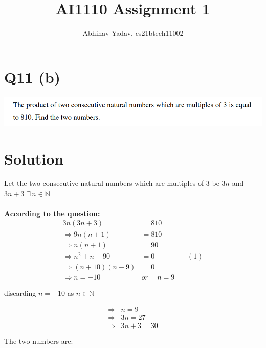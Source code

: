 \documentclass[11pt, a4paper]{article}
\title{AI1110 Assignment 1}
\author{Abhinav Yadav, cs21btech11002}
\begin{document}
    \maketitle
    \section*{Q11 (b)}
    \includegraphics[width=\textwidth]{q11_b.png}
    \section*{Solution}
    Let the two consecutive natural numbers which are multiples of $3$ be $3n$ and $3n+3$
    \hspace{5pt} $\exists \hspace{2pt} n \in \mathbb{N}$\\\\
    \textbf{According to the question:}
    \begin{align*}
        3n(3n+3) &= 810\\
        \Rightarrow 9n(n+1) &= 810\\
        \Rightarrow n(n+1) &= 90\\
        \Rightarrow n^2+n-90 &= 0\hspace{40pt} -(1)\\
        \Rightarrow (n+10)(n-9) &= 0\\
        \Rightarrow n=-10 \hspace{15pt} &or \hspace{15pt} n=9
    \end{align*}
    \begin{center}
        discarding $n=-10$ as $n \in \mathbb{N}$
    \end{center}
    \begin{equation*}
        \begin{split}
            \Rightarrow & n=9\\
            \Rightarrow & 3n=27\\
            \Rightarrow & 3n+3=30\\\\
        \end{split}
    \end{equation*} 
    The two numbers are:\\
    \pagebreak
\end{document}
